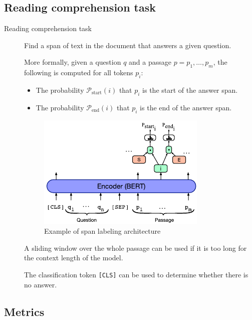 \subsection{Reading comprehension task}

\begin{description}
    \item[Reading comprehension task] 
        Find a span of text in the document that answers a given question.

        More formally, given a question $q$ and a passage $p = p_1, \dots, p_m$, the following is computed for all tokens $p_i$:
        \begin{itemize}
            \item The probability $\mathcal{P}_\text{start}(i)$ that $p_i$ is the start of the answer span.
            \item The probability $\mathcal{P}_\text{end}(i)$ that $p_i$ is the end of the answer span.
        \end{itemize}

        \begin{figure}[H]
            \centering
            \includegraphics[width=0.35\linewidth]{./img/_qa_bert.pdf}
            \caption{Example of span labeling architecture}
        \end{figure}

        \begin{remark}
            A sliding window over the whole passage can be used if it is too long for the context length of the model.
        \end{remark}

        \begin{remark}
            The classification token \texttt{[CLS]} can be used to determine whether there is no answer.
        \end{remark}
\end{description}


\subsection{Metrics}

